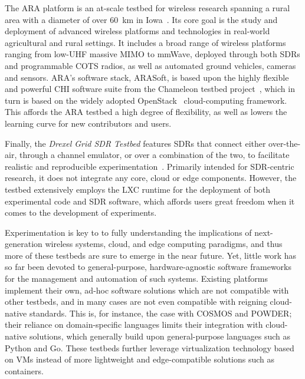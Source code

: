 The \ac{ARA} platform is an at-scale testbed for wireless research spanning a rural area with a diameter of over \SI{60}{\kilo\meter} in Iowa~\cite{zhang2022ara}.
Its core goal is the study and deployment of advanced wireless platforms and technologies in real-world agricultural and rural settings.
It includes a broad range of wireless platforms ranging from low-\ac{UHF} massive \ac{MIMO} to \unit{\milli\meter}Wave, deployed through both \acp{SDR} and programmable \ac{COTS} radios, as well as automated ground vehicles, cameras and sensors.
\ac{ARA}'s software stack, ARASoft, is based upon the highly flexible and powerful \ac{CHI} software suite from the Chameleon testbed project~\cite{keahey2020lessons}, which in turn is based on the widely adopted OpenStack~\cite{openstack} cloud-computing framework.
This affords the \ac{ARA} testbed a high degree of flexibility, as well as lowers the learning curve for new contributors and users.

Finally, the \emph{Drexel Grid \ac{SDR} Testbed} features \acp{SDR} that connect either over-the-air, through a channel emulator, or over a combination of the two, to facilitate realistic and reproducible experimentation~\cite{DrexelGrid}.
Primarily intended for \ac{SDR}-centric research, it does not integrate any core, cloud or edge components.
However, the testbed extensively employs the \ac{LXC} runtime for the deployment of both experimental code and \ac{SDR} software, which affords users great freedom when it comes to the development of experiments.

Experimentation is key to to fully understanding the implications of next-generation wireless systems, cloud, and edge computing paradigms, and thus more of these testbeds are sure to emerge in the near future.
Yet, little work has so far been devoted to general-purpose, hardware-agnostic software frameworks for the management and automation of such systems.
Existing platforms implement their own, ad-hoc software solutions which are not compatible with other testbeds, and in many cases are not even compatible with reigning cloud-native standards.
This is, for instance, the case with \ac{COSMOS} and \ac{POWDER}; their reliance on domain-specific languages limits their integration with cloud-native solutions, which generally build upon general-purpose languages such as Python and Go.
These testbeds further leverage virtualization technology based on \acp{VM} instead of more lightweight and edge-compatible solutions such as containers.

